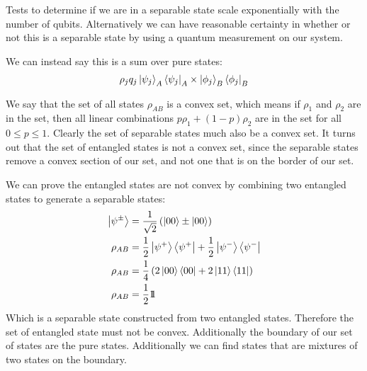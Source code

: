 Tests to determine if we are in a separable state scale exponentially with the number of qubits. Alternatively we can have reasonable certainty in whether or not this is a separable state by using a quantum measurement on our system.

We can instead say this is a sum over pure states:
\begin{align*}
	\rho_j q_j \ket{\psi_j}_A\bra{\psi_j}_A \times \ket{\phi_j}_B\bra{\phi_j}_B
\end{align*}

We say that the set of all states $\rho_{AB}$ is a convex set, which means if $\rho_1$ and $\rho_2$ are in the set, then all linear combinations $p\rho_1 + (1-p)\rho_2$ are in the set for all $0\leq p \leq 1$.
Clearly the set of separable states much also be a convex set. It turns out that the set of entangled states is not a convex set, since the separable states remove a convex section of our set, and not one that is on the border of our set.

We can prove the entangled states are not convex by combining two entangled states to generate a separable states:
\begin{align*}
	\ket{\psi^\pm} &= \frac{1}{\sqrt{2}}\left(\ket{00} \pm \ket{00}\right) \\
	\rho_{AB} &= \frac{1}{2} \ket{\psi^+}\bra{\psi^+} +\frac{1}{2} \ket{\psi^-}\bra{\psi^-} \\
	\rho_{AB} &= \frac{1}{4}\left(2\ket{00}\bra{00} + 2\ket{11}\bra{11}\right) \\
	\rho_{AB} &= \frac{1}{2} 1\!\!1
\end{align*}
Which is a separable state constructed from two entangled states. Therefore the set of entangled state must not be convex. Additionally the boundary of our set of states are the pure states. Additionally we can find states that are mixtures of two states on the boundary.
